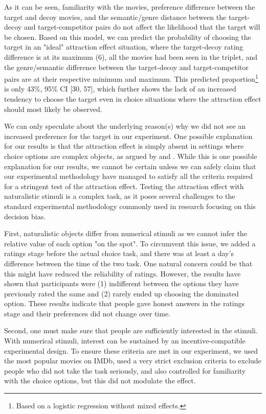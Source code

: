 \documentclass[11pt,a4paper]{article}
\begin{document}
As it can be seen, familiarity with the movies, preference difference between the target and decoy movies, and the semantic/genre distance between the target-decoy and target-competitor pairs do not affect the likelihood that the target will be chosen. Based on this model, we can predict the probability of choosing the target in an "ideal" attraction effect situation, where the target-decoy rating difference is at its maximum (6), all the movies had been seen in the triplet, and the genre/semantic difference between the target-decoy and target-competitor pairs are at their respective minimum and maximum. This predicted proportion\footnote{Based on a logistic regression without mixed effects.} is only 43\%, 95\% CI [30, 57], which further shows the lack of an increased tendency to choose the target even in choice situations where the attraction effect should most likely be observed.


We can only speculate about the underlying reason(s) why we did not see an increased preference for the target in our experiment. One possible explanation for our results is that the attraction effect is simply absent in settings where choice options are complex objects, as argued by  and . While this is one possible explanation for our results, we cannot be certain unless we can safely claim that our experimental methodology have managed to satisfy all the criteria required for a stringent test of the attraction effect. Testing the attraction effect with naturalistic stimuli is a complex task, as it poses several challenges to the standard experimental methodology commonly used in research focusing on this decision bias. 


First, naturalistic objects differ from numerical stimuli as we cannot infer the relative value of each option "on the spot". To circumvent this issue, we added a ratings stage before the actual choice task, and there was at least a day's difference between the time of the two task. One natural concern could be that this might have reduced the reliability of ratings. However, the results have shown that participants were (1) indifferent between the options they have previously rated the same and (2) rarely ended up choosing the dominated option. These results indicate that people gave honest answers in the ratings stage and their preferences did not change over time. 

Second, one must make sure that people are sufficiently interested in the stimuli. With numerical stimuli, interest can be sustained by an incentive-compatible experimental design. To ensure these criteria are met in our experiment, we used the most popular movies on IMDb, used a very strict exclusion criteria to exclude people who did not take the task seriously, and also controlled for familiarity with the choice options, but this did not modulate the effect.  
\end{document}
